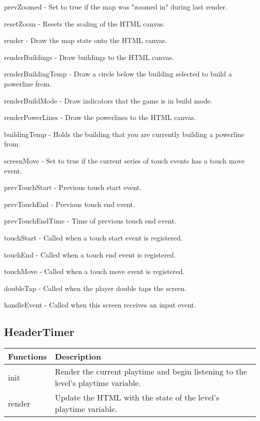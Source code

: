 	prevZoomed - Set to true if the map was "zoomed in" during last render.

	resetZoom - Resets the scaling of the HTML canvas.

	render - Draw the map state onto the HTML canvas.

	renderBuildings - Draw buildings to the HTML canvas.

	renderBuildingTemp - Draw a circle below the building selected to build a powerline from.

	renderBuildMode - Draw indicators that the game is in build mode.

	renderPowerLines - Draw the powerlines to the HTML canvas.

	buildingTemp - Holds the building that you are currently building a powerline from.

  	screenMove - Set to true if the current series of touch events has a touch move event.

  	prevTouchStart - Previous touch start event.

 	prevTouchEnd - Previous touch end event.

  	prevTouchEndTime - Time of previous touch end event.

  	touchStart - Called when a touch start event is registered.

  	touchEnd - Called when a touch end event is registered.

  	touchMove - Called when a touch move event is registered.

  	doubleTap - Called when the player double taps the screen.

  	handleEvent - Called when this screen receives an input event.

\subsection*{HeaderTimer}

	\begin{table}[H]
	\begin{tabular}{p{4cm} | p{8cm} }
	\hline
	\rowcolor{gray}
	Functions & Description \\ \hline
	init & Render the current playtime and begin listening to the level's playtime variable. \\ \hline
	render & Update the HTML with the state of the level's playtime variable. \\ \hline
	\end{tabular}
	\end{table}

